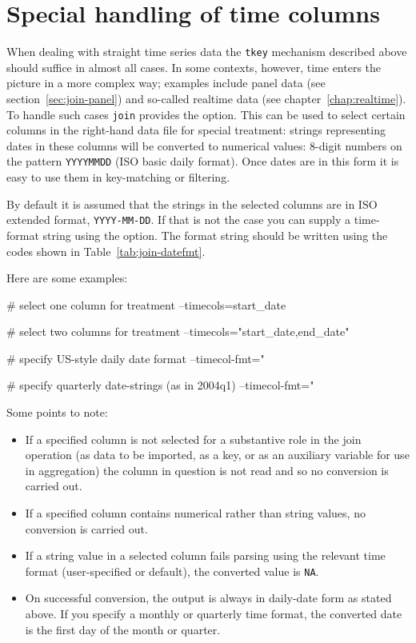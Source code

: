 \section{Special handling of time columns}
\label{sec:join-timecols}

When dealing with straight time series data the \texttt{tkey}
mechanism described above should suffice in almost all cases. In some
contexts, however, time enters the picture in a more complex way;
examples include panel data (see section~\ref{sec:join-panel}) and
so-called realtime data (see chapter~\ref{chap:realtime}). To handle
such cases \texttt{join} provides the  option. This
can be used to select certain columns in the right-hand data file for
special treatment: strings representing dates in these columns will be
converted to numerical values: 8-digit numbers on the pattern
\texttt{YYYYMMDD} (ISO basic daily format).  Once dates are in this
form it is easy to use them in key-matching or filtering.

By default it is assumed that the strings in the selected columns are
in ISO extended format, \texttt{YYYY-MM-DD}. If that is not
the case you can supply a time-format string using the
 option. The format string should be written using
the codes shown in Table~\ref{tab:join-datefmt}.

Here are some examples:

\begin{code}
# select one column for treatment
--timecols=start_date

# select two columns for treatment
--timecols="start_date,end_date"

# specify US-style daily date format
--timecol-fmt="%

# specify quarterly date-strings (as in 2004q1)
--timecol-fmt="%
\end{code}

Some points to note:

\begin{itemize}
\item If a specified column is not selected for a substantive role in
  the join operation (as data to be imported, as a key, or as an
  auxiliary variable for use in aggregation) the column in question is
  not read and so no conversion is carried out.
\item If a specified column contains numerical rather than string
  values, no conversion is carried out.
\item If a string value in a selected column fails parsing using the
  relevant time format (user-specified or default), the converted
  value is \texttt{NA}.
\item On successful conversion, the output is always in daily-date
  form as stated above. If you specify a monthly or quarterly time
  format, the converted date is the first day of the month or quarter.
\end{itemize}

